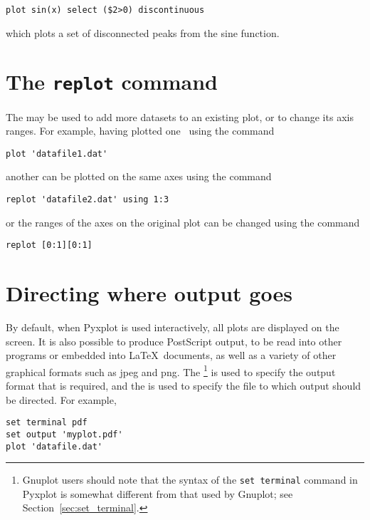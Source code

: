\begin{verbatim}
plot sin(x) select ($2>0) discontinuous
\end{verbatim}

\noindent which plots a set of disconnected peaks from the sine function.

\section{The {\tt replot} command}
\label{sec:replot}

The  may be used to add more datasets to an existing plot, or
to change its axis ranges. For example, having plotted one \datafile\ using the
command

\begin{verbatim}
plot 'datafile1.dat'
\end{verbatim}

\noindent another can be plotted on the same axes using the command

\begin{verbatim}
replot 'datafile2.dat' using 1:3
\end{verbatim}

\noindent or the ranges of the axes on the original plot can be changed using
the command

\begin{verbatim}
replot [0:1][0:1]
\end{verbatim}

\section{Directing where output goes}
\label{sec:directing_output}

By default, when Pyxplot is used interactively, all plots are displayed on the
screen. It is also possible to produce PostScript output, to be read into other
programs or embedded into \LaTeX\ documents, as well as a variety of other
graphical formats such as jpeg and png. The \footnote{Gnuplot users should note that the syntax of the {\tt set
terminal} command in Pyxplot is somewhat different from that used by Gnuplot;
see Section~\ref{sec:set_terminal}.} is used to specify the output format that
is required, and the  is used to specify the file to which
output should be directed. For example,

\begin{verbatim}
set terminal pdf
set output 'myplot.pdf'
plot 'datafile.dat'
\end{verbatim}

